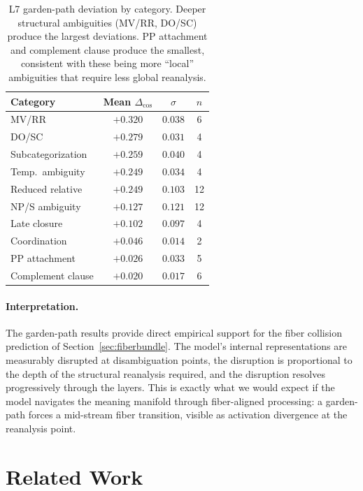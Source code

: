 \documentclass[11pt]{article}
\begin{document}
\begin{table}[t]
\centering
\small
\begin{tabular}{@{}lccc@{}}
\toprule
\textbf{Category} & \textbf{Mean $\Delta_{\cos}$} & \textbf{$\sigma$} & $n$ \\
\midrule
MV/RR              & $+0.320$ & $0.038$ & 6 \\
DO/SC              & $+0.279$ & $0.031$ & 4 \\
Subcategorization  & $+0.259$ & $0.040$ & 4 \\
Temp.\ ambiguity   & $+0.249$ & $0.034$ & 4 \\
Reduced relative   & $+0.249$ & $0.103$ & 12 \\
NP/S ambiguity     & $+0.127$ & $0.121$ & 12 \\
Late closure       & $+0.102$ & $0.097$ & 4 \\
Coordination       & $+0.046$ & $0.014$ & 2 \\
PP attachment      & $+0.026$ & $0.033$ & 5 \\
Complement clause  & $+0.020$ & $0.017$ & 6 \\
\bottomrule
\end{tabular}
\caption{L7 garden-path deviation by category. Deeper structural 
ambiguities (MV/RR, DO/SC) produce the largest deviations. PP 
attachment and complement clause produce the smallest, consistent 
with these being more ``local'' ambiguities that require less 
global reanalysis.}
\label{tab:gardenpath-cats}
\end{table}

\paragraph{Interpretation.}
The garden-path results provide direct empirical support for the 
fiber collision prediction of Section~\ref{sec:fiberbundle}. The 
model's internal representations are measurably disrupted at 
disambiguation points, the disruption is proportional to the 
depth of the structural reanalysis required, and the disruption 
resolves progressively through the layers. This is exactly 
what we would expect if the model navigates the meaning manifold 
through fiber-aligned processing: a garden-path forces a mid-stream 
fiber transition, visible as activation divergence at the 
reanalysis point.

\section{Related Work}
\label{sec:related}
\end{document}
